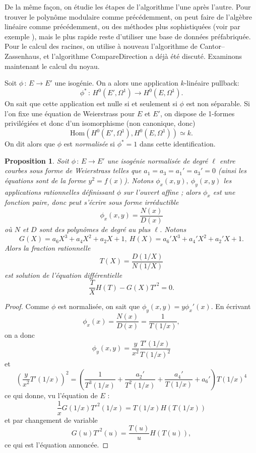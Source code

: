 \documentclass[11pt,a4paper]{article}
\newcommand{\vers}{\longrightarrow}
\newcommand{\Hom}{\mathrm{Hom}}
\newcommand{\de}{\,:\,}
\renewcommand{\v}{\vspace{5mm}}
\newtheorem*{prop}{Proposition}
\theoremstyle{definition}
\begin{document}
De la même façon, on étudie les étapes de l'algorithme l'une après l'autre. Pour trouver le polynôme modulaire comme précédemment, on peut faire de l'algèbre linéaire comme précédemment, ou des méthodes plus sophistiquées (voir par exemple \cite{Elkies}), mais le plus rapide reste d'utiliser une base de données préfabriquée. Pour le calcul des racines, on utilise à nouveau l'algorithme de Cantor--Zassenhaus, et l'algorithme {\sc CompareDirection} a déjà été discuté. Examinons maintenant le calcul du noyau.

\v
Soit $\phi\de E\vers E'$ une isogénie. On a alors une application $k$-linéaire \og pullback\fg:
$$\phi^*\de H^0(E', \Omega^1)\vers H^0(E, \Omega^1).$$
On sait que cette application est nulle si et seulement si $\phi$ est non séparable. Si l'on fixe une équation de Weierstrass pour $E$ et $E'$, on dispose de 1-formes privilégiées et donc d'un isomorphisme (non canonique, donc)
$$\Hom(H^0(E', \Omega^1), H^0(E, \Omega^1))\simeq k.$$
On dit alors que $\phi$ est \emph{normalisée} si $\phi^* = 1$ dans cette identification.

\begin{prop}
Soit $\phi\de E\vers E'$ une isogénie normalisée de degré $\ell$ entre courbes sous forme de Weierstrass telles que $a_1 = a_3 = a_1' = a_3' = 0$ (ainsi les équations sont de la forme $y^2 = f(x)$). Notons $\phi_x(x,y),\ \phi_y(x,y)$ les applications rationnelles définissant $\phi$ sur l'ouvert affine ; alors $\phi_x$ est une fonction paire, donc peut s'écrire sous forme irréductible
$$\phi_x(x, y) = \frac{N(x)}{D(x)}$$
où $N$ et $D$ sont des polynômes de degré au plus $\ell$. Notons
$$G(X) = a_6 X^3 + a_4 X^2 + a_2 X + 1,\ H(X) =a_6' X^3 + a_4' X^2 + a_2' X + 1.$$
Alors la fraction rationnelle 
$$T(X) = \frac{D(1/X)}{N(1/X)}$$
est solution de l'équation différentielle
$$\frac{T}{X} H(T) - G(X) T'^2 = 0.$$
\end{prop}

\begin{proof}
Comme $\phi$ est normalisée, on sait que $\phi_y (x, y) = y \phi_x'(x).$ En écrivant 
$$\phi_x(x) = \frac{N(x)}{D(x)} = \frac{1}{T(1/x)},$$
on a donc
$$\phi_y(x, y) = \frac{y}{x^2} \frac{T'(1/x)}{T(1/x)^2}$$
et
$$ \left(\frac{y}{x^2} T'(1/x)\right)^2 = \left(\frac{1}{T^3(1/x)} + \frac{a_2'}{T^2(1/x)} + \frac{a_4'}{T(1/x)} + a_6'\right)T(1/x)^4$$
ce qui donne, vu l'équation de $E$ :
$$ \frac{1}{x} G(1/x) T'^2(1/x) =T(1/x) H(T(1/x))$$
et par changement de variable
$$ G(u) T'^2(u) = \frac{T(u)}{u} H(T(u)),$$
ce qui est l'équation annoncée.
\end{proof}
\end{document}
